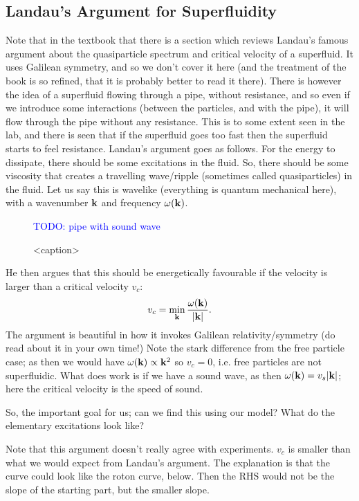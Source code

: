 \subsection{Landau's Argument for Superfluidity}
Note that in the textbook that there is a section which reviews Landau's famous argument about the quasiparticle spectrum and critical velocity of a superfluid. It uses Galilean symmetry, and so we don't cover it here (and the treatment of the book is so refined, that it is probably better to read it there). There is however the idea of a superfluid flowing through a pipe, without resistance, and so even if we introduce some interactions (between the particles, and with the pipe), it will flow through the pipe without any resistance. This is to some extent seen in the lab, and there is seen that if the superfluid goes too fast then the superfluid starts to feel resistance. Landau's argument goes as follows. For the energy to dissipate, there should be some excitations in the fluid. So, there should be some viscosity that creates a travelling wave/ripple (sometimes called quasiparticles) in the fluid. Let us say this is wavelike (everything is quantum mechanical here), with a wavenumber $\mathbf{k}$ and frequency $\omega(\mathbf{k})$. 

\begin{figure}[htbp]
    \centering
    \textcolor{blue}{TODO: pipe with sound wave}
    \caption{<caption>}
    \label{<label>}
\end{figure}


He then argues that this should be energetically favourable if the velocity is larger than a critical velocity $v_c$:
\begin{equation}
    v_c = \min_{\mathbf{k}} \frac{\omega(\mathbf{k})}{\lvert \mathbf{k} \rvert}.
\end{equation}
The argument is beautiful in how it invokes Galilean relativity/symmetry (do read about it in your own time!) Note the stark difference from the free particle case; as then we would have $\omega(\mathbf{k}) \propto \mathbf{k}^2$ so $v_c = 0$, i.e. free particles are not superfluidic. What does work is if we have a sound wave, as then $\omega(\mathbf{k}) = v_s\lvert \mathbf{k} \rvert$; here the critical velocity is the speed of sound.

So, the important goal for us; can we find this using our model? What do the elementary excitations look like?

Note that this argument doesn't really agree with experiments. $v_c$ is smaller than what we would expect from Landau's argument. The explanation is that the curve could look like the roton curve, below. Then the RHS would not be the slope of the starting part, but the smaller slope.

